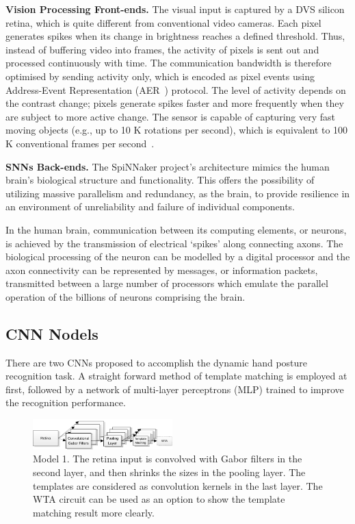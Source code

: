 \documentclass[journal]{journal}
\begin{document}
\textbf{Vision Processing Front-ends.}
The visual input is captured by a DVS silicon retina, which is quite different from conventional video cameras.
Each pixel generates spikes when its change in brightness reaches a defined threshold.
Thus, instead of buffering video into frames, the activity of pixels is sent out and processed continuously with time.
The communication bandwidth is therefore optimised by sending activity only, which is encoded as pixel events using Address-Event Representation (AER~\cite{lazzaro1995multi}) protocol.
The level of activity depends on the contrast change; pixels generate spikes faster and more frequently when they are subject to more active change.
The sensor is capable of capturing very fast moving objects (e.g., up to 10 K rotations per second), which is equivalent to 100 K conventional frames per second~\cite{lenero20113}.

\textbf{SNNs Back-ends.}
The SpiNNaker project's architecture mimics the human brain's biological structure and functionality. 
This offers the possibility of utilizing massive parallelism and redundancy, as the brain, to provide resilience in an environment of unreliability and failure of individual components.

In the human brain, communication between its computing elements, or neurons, is achieved by the transmission of electrical `spikes' along connecting axons. 
The biological processing of the neuron can be modelled by a digital processor and the axon connectivity can be represented by messages, or information packets, transmitted between a large number of processors which emulate the parallel operation of the billions of neurons comprising the brain.

\subsection{CNN Nodels}
There are two CNNs proposed to accomplish the dynamic hand posture recognition task.
A straight forward method of template matching is employed at first, followed by a network of multi-layer perceptrons (MLP) trained to improve the recognition performance.

\begin{figure}
\centering
	\includegraphics[width=0.48\textwidth]{pics/model1.pdf}
	\caption{Model 1. 
	The retina input is convolved with Gabor filters in the second layer, and then shrinks the sizes in the pooling layer.
	The templates are considered as convolution kernels in the last layer.
	The WTA circuit can be used as an option to show the template matching result more clearly.
	}
	\label{fig:model1}
\end{figure}
\end{document}
